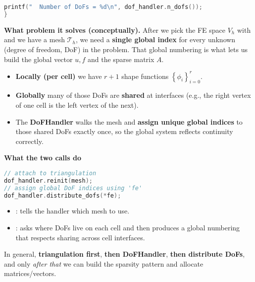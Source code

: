 \begin{enumerate}
\begin{lstlisting}[language=C++]
    printf("  Number of DoFs = %d\n", dof_handler.n_dofs());
}\end{lstlisting}
    \textcolor{Green3}{ \textbf{What problem it solves (conceptually).}} After we pick the FE space $V_{h}$ with  and we have a mesh $\mathcal{T}_{h}$, we need a \textbf{single global index} for every unknown (degree of freedom, DoF) in the problem. That global numbering is what lets us build the global vector $u, f$ and the sparse matrix $A$.
    \begin{itemize}
        \item \textbf{Locally (per cell)} we have $r+1$ shape functions $\left\{\phi_{i}\right\}_{i=0}^{r}$.
        \item \textbf{Globally} many of those DoFs are \textbf{shared} at interfaces (e.g., the right vertex of one cell is the left vertex of the next).
        \item The \textbf{DoFHandler} walks the mesh and \textbf{assign unique global indices} to those shared DoFs exactly once, so the global system reflects continuity correctly.
    \end{itemize}

    \textcolor{Green3}{ \textbf{What the two calls do}}
    \begin{lstlisting}[language=C++]
// attach to triangulation
dof_handler.reinit(mesh);
// assign global DoF indices using 'fe'
dof_handler.distribute_dofs(*fe);\end{lstlisting}
    \begin{itemize}
        \item {}: tells the handler which mesh to use.
        \item {}: asks  where DoFs live on each cell and then produces a global numbering that respects sharing across cell interfaces.
    \end{itemize}
    In general, \textbf{triangulation first}, \textbf{then DoFHandler}, \textbf{then distribute DoFs}, and only \emph{after that} we can build the sparsity pattern and allocate matrices/vectors.


\end{enumerate}
